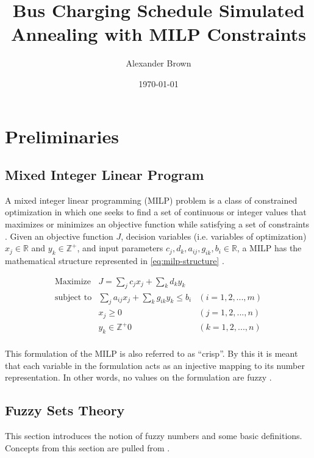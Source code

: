 \documentclass[11pt,a4paper,final]{article}
\author{Alexander Brown}
\date{\today}
\title{Bus Charging Schedule Simulated Annealing with MILP Constraints}
\begin{document}
\maketitle
\tableofcontents


\section{Preliminaries}
\label{sec:org499a2ff}
\subsection{Mixed Integer Linear Program}
\label{sec:org3e2531e}
A mixed integer linear programming (MILP) problem is a class of constrained optimization in which one seeks to find a
set of continuous or integer values that maximizes or minimizes an objective function while satisfying a set of
constraints \cite{chen-2010-applied}. Given an objective function \(J\), decision variables (i.e. variables of
optimization) \(x_j \in \mathbb{R}\) and \(y_k \in \mathbb{Z}^+\), and input parameters \(c_j, d_k, a_{ij}, g_{ik}, b_i \in \mathbb{R}\), a MILP has the
mathematical structure represented in \autoref{eq:milp-structure} \cite{chen-2010-applied}.

\begin{equation}
\label{eq:milp-structure}
\begin{array}{lll}
\text{Maximize}   & J = \sum_j c_j x_j + \sum_k d_k y_k            &                 \\
\text{subject to} & \sum_j a_{ij} x_j + \sum_k g_{ik} y_k  \le b_i & (i = 1,2,...,m) \\
                  & x_j \ge 0                                      & (j = 1,2,...,n) \\
                  & y_k \in \mathbb{Z^+}0                          & (k = 1,2,...,n) \\
\end{array}
\end{equation}

This formulation of the MILP is also referred to as ``crisp''. By this it is meant that each variable in the formulation
acts as an injective mapping to its number representation. In other words, no values on the formulation are fuzzy
\cite{kaur-2016-introd-fuzzy}.

\subsection{Fuzzy Sets Theory}
\label{sec:org78c693b}
This section introduces the notion of fuzzy numbers and some basic definitions. Concepts from this section are pulled
from \cite{zimmermann-2001-fuzzy-set,das-2016-mathem-model,yaghobi-2014-compar-fuzzy,bello-2019-fuzzy-activ}.
\end{document}
